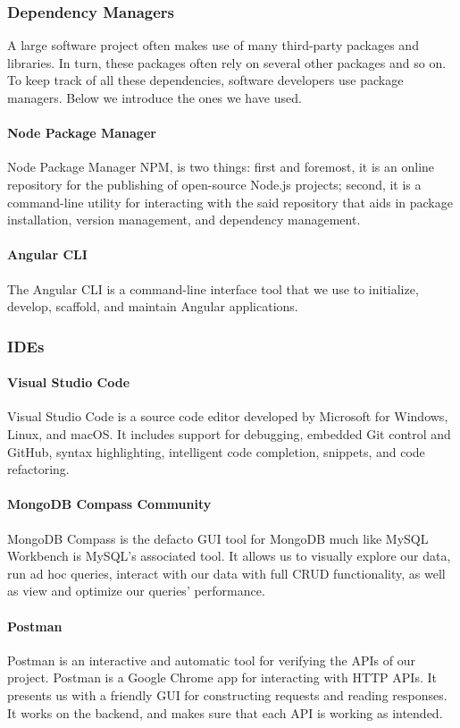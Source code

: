 \subsubsection{Dependency Managers}
A large software project often makes use of many third-party packages and libraries. In turn, these packages
often rely on several other packages and so on. To keep track of all these dependencies, software developers
use package managers. Below we introduce the ones we have used.
\paragraph*{Node Package Manager}
Node Package Manager \ac{NPM}, is two things: first and foremost, it is an online repository for the publishing of open-source Node.js projects; second, it is a command-line utility for interacting with the said repository that aids in package installation, version management, and dependency management.
\paragraph*{Angular CLI}
The Angular CLI is a command-line interface tool that we use to initialize, develop, scaffold, and maintain Angular applications. 
\subsubsection{IDEs}

\paragraph*{Visual Studio Code}
Visual Studio Code is a source code editor developed by Microsoft for Windows, Linux, and macOS. It includes support for debugging, embedded Git control and GitHub, syntax highlighting, intelligent code completion, snippets, and code refactoring.


\paragraph*{MongoDB Compass Community}
MongoDB Compass is the defacto GUI tool for MongoDB much like MySQL Workbench is MySQL’s associated tool. It allows us to visually explore our data, run ad hoc queries, interact with our data with full CRUD functionality, as well as view and optimize our queries’ performance.


\paragraph*{Postman}
Postman is an interactive and automatic tool for verifying the APIs of our project. Postman is a Google Chrome app for interacting with HTTP APIs. It presents us with a friendly GUI for constructing requests and reading responses. It works on the backend, and makes sure that each API is working as intended.

